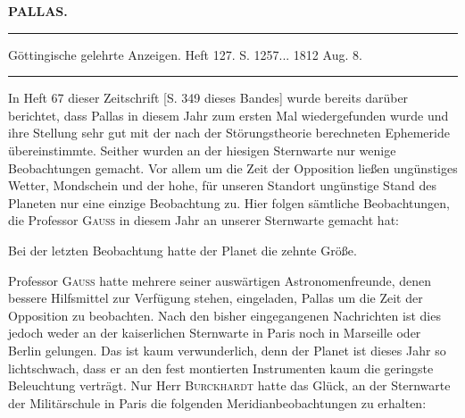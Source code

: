 \clearpage{}\hypertarget{native-361-lower}{}\label{native-361-lower}
\begin{center}\textbf{PALLAS.}\par\vspace{4pt}\hrule\vspace{4pt}\fontsize{10}{12}\selectfont Göttingische gelehrte Anzeigen. Heft 127. S. 1257\;... 1812 Aug. 8.\par\vspace{4pt}\hrule\vspace{4pt}\end{center}

\par\indent In Heft 67 dieser Zeitschrift [S. 349 dieses Bandes] wurde bereits darüber berichtet, dass Pallas in diesem Jahr zum ersten Mal wiedergefunden wurde und ihre Stellung sehr gut mit der nach der Störungstheorie berechneten Ephemeride übereinstimmte. Seither wurden an der hiesigen Sternwarte nur wenige Beobachtungen gemacht. Vor allem um die Zeit der Opposition ließen ungünstiges Wetter, Mondschein und der hohe, für unseren Standort ungünstige Stand des Planeten nur eine einzige Beobachtung zu. Hier folgen sämtliche Beobachtungen, die Professor \textsc{Gauss} in diesem Jahr an unserer Sternwarte gemacht hat:

\smallskip

\par\indent Bei der letzten Beobachtung hatte der Planet die zehnte Größe.

\par\indent Professor \textsc{Gauss} hatte mehrere seiner auswärtigen Astronomenfreunde, denen bessere Hilfsmittel zur Verfügung stehen, eingeladen, Pallas um die Zeit der Opposition zu beobachten. Nach den bisher eingegangenen Nachrichten ist dies jedoch weder an der kaiserlichen Sternwarte in Paris noch in Marseille oder Berlin gelungen. Das ist kaum verwunderlich, denn der Planet ist dieses Jahr so lichtschwach, dass er an den fest montierten Instrumenten kaum die geringste Beleuchtung verträgt. Nur Herr \textsc{Burckhardt} hatte das Glück, an der Sternwarte der Militärschule in Paris die folgenden Meridianbeobachtungen zu erhalten:

